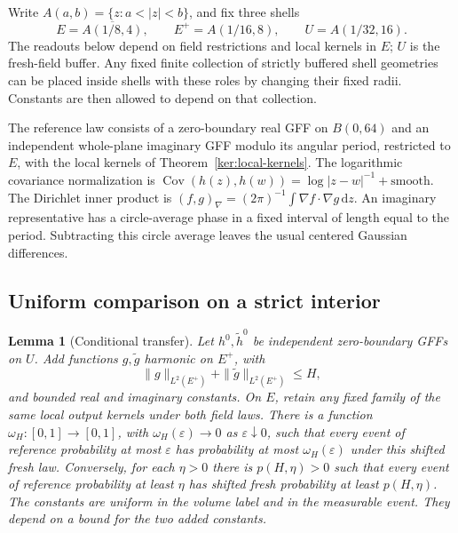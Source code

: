 \documentclass[11pt]{article}
\numberwithin{equation}{section}
\newtheorem{lemma}[theorem]{Lemma}
\theoremstyle{definition}
\theoremstyle{remark}
\newcommand{\1}{\mathbf 1}
\begin{document}
Write \(A(a,b)=\{z:a<|z|<b\}\), and fix three shells
\begin{equation}
 E=\overline{A(1/8,4)},\qquad E^+=A(1/16,8),\qquad
 U=A(1/32,16).
 \label{ann:shells}
\end{equation}
The readouts below depend on field restrictions and local kernels in
\(E\); \(U\) is the fresh-field buffer.  Any fixed finite collection of
strictly buffered shell geometries can be placed inside shells with
these roles by changing their fixed radii.  Constants are then allowed
to depend on that collection.

The reference law consists of a zero-boundary real GFF on \(B(0,64)\)
and an independent whole-plane imaginary GFF modulo its angular
period, restricted to \(E\), with the local kernels of
Theorem~\ref{ker:local-kernels}.  The logarithmic covariance
normalization is
\(\operatorname{Cov}(h(z),h(w))=\log|z-w|^{-1}+\text{smooth}\).
The Dirichlet inner product is
\((f,g)_\nabla=(2\pi)^{-1}\int\nabla f\cdot\nabla g\,\mathrm d z\).
An imaginary representative has a circle-average phase in a fixed
interval of length equal to the period.  Subtracting this circle
average leaves the usual centered Gaussian differences.

\subsection{Uniform comparison on a strict interior}

\begin{lemma}[Conditional transfer]\label{ann:conditional-transfer}
Let \(h^0,\widetilde h^0\) be independent zero-boundary GFFs on \(U\).
Add functions \(g,\widetilde g\) harmonic on \(E^+\), with
\[
 \|g\|_{L^2(E^+)}+\|\widetilde g\|_{L^2(E^+)}\le H,
\]
and bounded real and imaginary constants.  On \(E\), retain any fixed
family of the same local output kernels under both field laws.
There is a function \(\omega_H:[0,1]\to[0,1]\), with
\(\omega_H(\varepsilon)\to0\) as \(\varepsilon\downarrow0\), such that
every event of reference probability at most \(\varepsilon\) has
probability at most \(\omega_H(\varepsilon)\) under this shifted fresh
law.  Conversely, for each \(\eta>0\) there is \(p(H,\eta)>0\)
such that every event of reference probability at least \(\eta\) has
shifted fresh probability at least \(p(H,\eta)\).
The constants are uniform in the volume label and in the measurable
event.  They depend on a bound for the two added constants.
\end{lemma}
\end{document}
